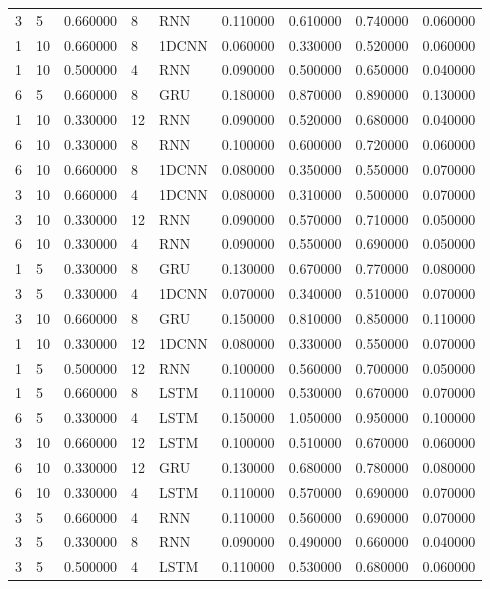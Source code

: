 \begin{tabular}{llrllrrrr}
3 & 5 & 0.660000 & 8 & RNN & 0.110000 & 0.610000 & 0.740000 & 0.060000 \\
1 & 10 & 0.660000 & 8 & 1DCNN & 0.060000 & 0.330000 & 0.520000 & 0.060000 \\
1 & 10 & 0.500000 & 4 & RNN & 0.090000 & 0.500000 & 0.650000 & 0.040000 \\
6 & 5 & 0.660000 & 8 & GRU & 0.180000 & 0.870000 & 0.890000 & 0.130000 \\
1 & 10 & 0.330000 & 12 & RNN & 0.090000 & 0.520000 & 0.680000 & 0.040000 \\
6 & 10 & 0.330000 & 8 & RNN & 0.100000 & 0.600000 & 0.720000 & 0.060000 \\
6 & 10 & 0.660000 & 8 & 1DCNN & 0.080000 & 0.350000 & 0.550000 & 0.070000 \\
3 & 10 & 0.660000 & 4 & 1DCNN & 0.080000 & 0.310000 & 0.500000 & 0.070000 \\
3 & 10 & 0.330000 & 12 & RNN & 0.090000 & 0.570000 & 0.710000 & 0.050000 \\
6 & 10 & 0.330000 & 4 & RNN & 0.090000 & 0.550000 & 0.690000 & 0.050000 \\
1 & 5 & 0.330000 & 8 & GRU & 0.130000 & 0.670000 & 0.770000 & 0.080000 \\
3 & 5 & 0.330000 & 4 & 1DCNN & 0.070000 & 0.340000 & 0.510000 & 0.070000 \\
3 & 10 & 0.660000 & 8 & GRU & 0.150000 & 0.810000 & 0.850000 & 0.110000 \\
1 & 10 & 0.330000 & 12 & 1DCNN & 0.080000 & 0.330000 & 0.550000 & 0.070000 \\
1 & 5 & 0.500000 & 12 & RNN & 0.100000 & 0.560000 & 0.700000 & 0.050000 \\
1 & 5 & 0.660000 & 8 & LSTM & 0.110000 & 0.530000 & 0.670000 & 0.070000 \\
6 & 5 & 0.330000 & 4 & LSTM & 0.150000 & 1.050000 & 0.950000 & 0.100000 \\
3 & 10 & 0.660000 & 12 & LSTM & 0.100000 & 0.510000 & 0.670000 & 0.060000 \\
6 & 10 & 0.330000 & 12 & GRU & 0.130000 & 0.680000 & 0.780000 & 0.080000 \\
6 & 10 & 0.330000 & 4 & LSTM & 0.110000 & 0.570000 & 0.690000 & 0.070000 \\
3 & 5 & 0.660000 & 4 & RNN & 0.110000 & 0.560000 & 0.690000 & 0.070000 \\
3 & 5 & 0.330000 & 8 & RNN & 0.090000 & 0.490000 & 0.660000 & 0.040000 \\
3 & 5 & 0.500000 & 4 & LSTM & 0.110000 & 0.530000 & 0.680000 & 0.060000 \\

\end{tabular}
